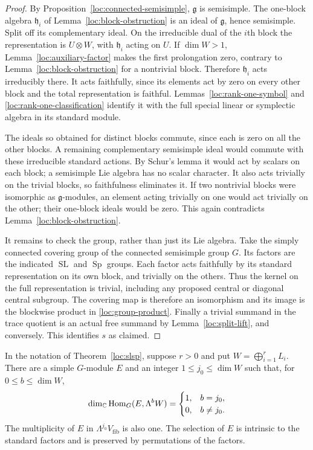 \begin{proof}
By Proposition~\ref{loc:connected-semisimple},
$\mathfrak g$ is semisimple.  The one-block algebra
$\mathfrak h_i$ of Lemma~\ref{loc:block-obstruction} is an
ideal of $\mathfrak g$, hence semisimple.  Split off its
complementary ideal.  On the irreducible dual of the $i$th
block the representation is $U\otimes W$, with
$\mathfrak h_i$ acting on $U$.  If $\dim W>1$,
Lemma~\ref{loc:auxiliary-factor} makes the first prolongation
zero, contrary to Lemma~\ref{loc:block-obstruction} for a
nontrivial block.  Therefore $\mathfrak h_i$ acts irreducibly
there.  It acts faithfully, since its elements act by zero on
every other block and the total representation is faithful.
Lemmas~\ref{loc:rank-one-symbol} and
\ref{loc:rank-one-classification} identify it with the full
special linear or symplectic algebra in its standard module.

The ideals so obtained for distinct blocks commute, since each
is zero on all the other blocks.  A remaining complementary
semisimple ideal would commute with these irreducible standard
actions.  By Schur's lemma it would act by scalars on each block;
a semisimple Lie algebra has no scalar character.  It also acts
trivially on the trivial blocks, so faithfulness eliminates it.
If two nontrivial blocks were isomorphic as $\mathfrak g$-modules,
an element acting trivially on one would act trivially on the
other; their one-block ideals would be zero.  This again
contradicts Lemma~\ref{loc:block-obstruction}.

It remains to check the group, rather than just its Lie algebra.
Take the simply connected covering group of the connected
semisimple group $G$.  Its factors are the indicated
$\operatorname{SL}$ and $\operatorname{Sp}$ groups.  Each
factor acts faithfully by its standard representation on its
own block, and trivially on the others.  Thus the kernel on the
full representation is trivial, including any proposed central
or diagonal central subgroup.  The covering map is therefore
an isomorphism and its image is the blockwise product in
\eqref{loc:group-product}.  Finally a trivial summand in the
trace quotient is an actual free summand by
Lemma~\ref{loc:split-lift}, and conversely.  This identifies $s$
as claimed.
\end{proof}

\begin{corollary}
\label{loc:exterior-constituent}
In the notation of Theorem~\ref{loc:slsp}, suppose $r>0$ and put
$W=\bigoplus_{i=1}^rL_i$.  There are a simple $G$-module $E$ and an
integer $1\leq j_0\leq\dim W$ such that, for $0\leq b\leq\dim W$,
\[
 \dim_{\mathbb C}\operatorname{Hom}_G(E,\Lambda^bW)=
 \begin{cases}1,&b=j_0,\\0,&b\ne j_0.\end{cases}
\]
The multiplicity of $E$ in $\Lambda^{j_0}V_{\mathrm{fib}}$ is also
one.  The selection of $E$ is intrinsic to the standard factors and
is preserved by permutations of the factors.
\end{corollary}

